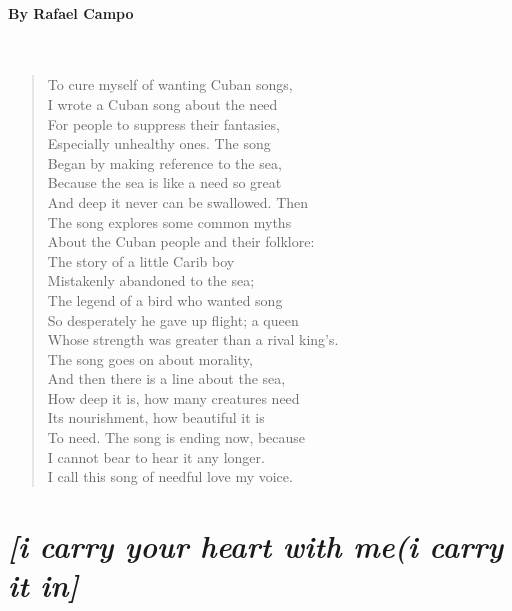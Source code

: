 \paragraph{By Rafael Campo}~
\begin{verse}
	To cure myself of wanting Cuban songs,\\
	I wrote a Cuban song about the need\\
	For people to suppress their fantasies,\\
	Especially unhealthy ones. The song\\
	Began by making reference to the sea,\\
	Because the sea is like a need so great\\
	And deep it never can be swallowed. Then\\
	The song explores some common myths\\
	About the Cuban people and their folklore:\\
	The story of a little Carib boy\\
	Mistakenly abandoned to the sea;\\
	The legend of a bird who wanted song\\
	So desperately he gave up flight; a queen\\
	Whose strength was greater than a rival king’s.\\
	The song goes on about morality,\\
	And then there is a line about the sea,\\
	How deep it is, how many creatures need\\
	Its nourishment, how beautiful it is\\
	To need. The song is ending now, because\\
	I cannot bear to hear it any longer.\\
	I call this song of needful love my voice.
\end{verse}

\newpage
\section*{\emph{[i carry your heart with me(i carry it in]}}
